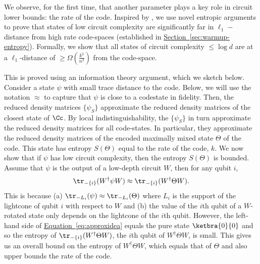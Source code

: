 \documentclass[11pt]{article}
\newcommand{\expref}[2]{\texorpdfstring{\hyperref[#2]{#1~\ref{#2}}}{#1~\ref{#2}}}
\newcommand{\expeqref}[2]{\texorpdfstring{\hyperref[#2]{#1~\eqref{#2}}}{#1~\eqref{#2}}}
\begin{document}
We observe, for the first time, that another parameter plays a key role in circuit lower bounds: the rate of the code. Inspired by \cite{PhysRevLett.104.050503}, we use novel entropic arguments to prove that states of low circuit complexity are significantly far in $\ell_1-$distance from high rate code-spaces (established in \expref{Section}{sec:warmup-entropy}). Formally, we show that all states of circuit complexity $\leq \log d$ are at a $\ell_1$-distance of $\geq \Omega(\frac{k^2}{n^2})$ from the code-space.

This is proved using an information theory argument, 
%
which we sketch below. Consider a state $\psi$ with small trace distance to the code.
%
Below, we will use
the notation  %
$\approx$ to capture %
%
that $\psi$ is close to a codestate in fidelity.
%
Then, the reduced density matrices $\{\psi_S\}$ approximate the reduced density matrices of the closest state of $\Cc$. By local indistinguishability, the $\{\psi_S\}$ in turn approximate the reduced density matrices for all code-states. In particular, they approximate the reduced density matrices of the encoded
%
maximally mixed   %
state $\Theta$ of the code. This state has entropy $S(\Theta)$ equal to the rate of the code, $k$. We now show that if $\psi$ has low circuit complexity, then the entropy $S(\Theta)$ is bounded. 
Assume that $\psi$ is the output of a low-depth circuit %
%
%
$W$, then for any qubit $i$,
%
%
\begin{align}
    \tr_{-\{i\}}(W^\dagger \psi W) \approx \tr_{-\{i\}}(W^\dagger \Theta W). \label{eq:approxidea}
\end{align}
This is because (a) $\tr_{-L_i}(\psi) \approx \tr_{-L_i}(\Theta)$ where $L_i$ is the support of the lightcone of qubit $i$ with respect to $W$ and (b) the value of the $i$th qubit of a $W$-rotated state only depends on the lightcone of the $i$th qubit. However, the left-hand side of \expeqref{Equation}{eq:approxidea} equals the pure state $\ketbra{0}{0}$ and so the entropy of $\tr_{-\{i\}}(W^\dagger \Theta W)$, the $i$th qubit of $W^\dagger \Theta W$, is small. This gives us an overall bound on the entropy of $W^\dagger\Theta W$, which equals that of $\Theta$ and also upper bounds the rate of the code.
\end{document}
